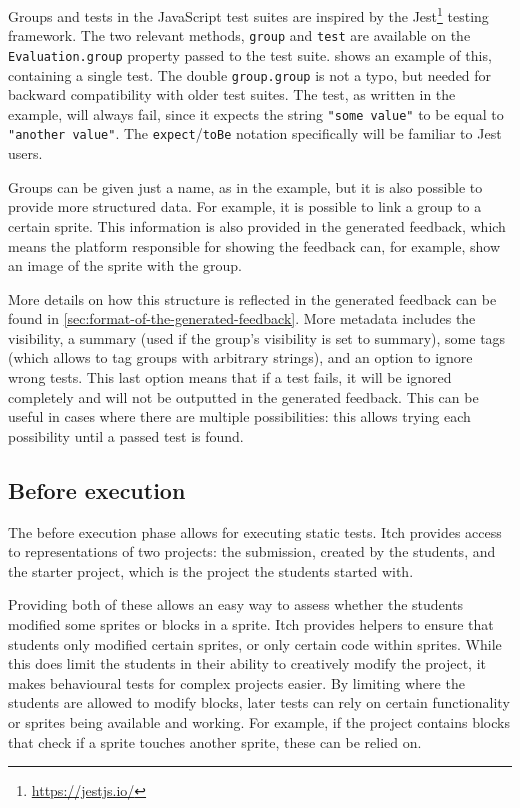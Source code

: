 \documentclass[../main]{subfiles}
\begin{document}
Groups and tests in the JavaScript test suites are inspired by the Jest\footnote{\url{https://jestjs.io/}} testing framework.
The two relevant methods, \texttt{group} and \texttt{test} are available on the \texttt{Evaluation.group} property passed to the test suite.
 shows an example of this, containing a single test.
The double \texttt{group.group} is not a typo, but needed for backward compatibility with older test suites.
The test, as written in the example, will always fail, since it expects the string \texttt{"some value"} to be equal to \texttt{"another value"}.
The \texttt{expect}/\texttt{toBe} notation specifically will be familiar to Jest users.

Groups can be given just a name, as in the example, but it is also possible to provide more structured data.
For example, it is possible to link a group to a certain sprite.
This information is also provided in the generated feedback, which means the platform responsible for showing the feedback can, for example, show an image of the sprite with the group.

More details on how this structure is reflected in the generated feedback can be found in \cref{sec:format-of-the-generated-feedback}.
More metadata includes the visibility, a summary (used if the group's visibility is set to summary), some tags (which allows to tag groups with arbitrary strings), and an option to ignore wrong tests.
This last option means that if a test fails, it will be ignored completely and will not be outputted in the generated feedback.
This can be useful in cases where there are multiple possibilities: this allows trying each possibility until a passed test is found.

\subsection{Before execution}\label{subsec:before-execution}

The before execution phase allows for executing static tests.
Itch provides access to representations of two projects: the submission, created by the students, and the starter project, which is the project the students started with.

Providing both of these allows an easy way to assess whether the students modified some sprites or blocks in a sprite.
Itch provides helpers to ensure that students only modified certain sprites, or only certain code within sprites.
While this does limit the students in their ability to creatively modify the project, it makes behavioural tests for complex projects easier.
By limiting where the students are allowed to modify blocks, later tests can rely on certain functionality or sprites being available and working.
For example, if the project contains blocks that check if a sprite touches another sprite, these can be relied on.
\end{document}

